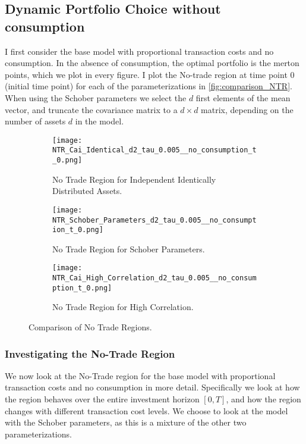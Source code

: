 \documentclass[11pt]{article}
\begin{document}
\subsection{Dynamic Portfolio Choice without consumption} \label{Subsection: NumericalIntegration}
I first consider the base model with proportional transaction costs
and no consumption. In the absence of consumption, the optimal portfolio is the merton points, which we plot in every figure.
I plot the No-trade region at time point 0 (initial time point) for each of the parameterizations in \autoref{fig:comparison_NTR}.
When using the Schober parameters we select the $d$ first elements of the mean vector, and truncate the covariance matrix to a $d \times d$ matrix,
depending on the number of assets $d$ in the model.
\begin{figure}[!ht]
    \centering
    \begin{subfigure}[t]{\textwidth}
        \centering
        \texttt{[image: NTR\_Cai\_Identical\_d2\_tau\_0.005\_\_no\_consumption\_t\_0.png]}
        \caption{No Trade Region for Independent Identically Distributed Assets.}
        \label{fig:NTR_2d_iid}
    \end{subfigure}

    \vspace{1em}

    \begin{subfigure}[t]{0.48\textwidth}
        \centering
        \texttt{[image: NTR\_Schober\_Parameters\_d2\_tau\_0.005\_\_no\_consumption\_t\_0.png]}
        \caption{No Trade Region for Schober Parameters.}
        \label{fig:NTR_2d_Schober}
    \end{subfigure}%
    \hfill
    \begin{subfigure}[t]{0.48\textwidth}
        \centering
        \texttt{[image: NTR\_Cai\_High\_Correlation\_d2\_tau\_0.005\_\_no\_consumption\_t\_0.png]}
        \caption{No Trade Region for High Correlation.}
        \label{fig:NTR_2d_High_Correlation}
    \end{subfigure}

    \caption{Comparison of No Trade Regions.}
    \label{fig:comparison_NTR}
\end{figure}

\subsubsection{Investigating the No-Trade Region} \label{Subsubsection: InvestigatingNTR}
We now look at the No-Trade region for the base model with proportional transaction costs and no consumption in more detail.
Specifically we look at how the region behaves over the entire investment horizon $[0, T]$, and how the region changes with different transaction cost levels.
We choose to look at the model with the Schober parameters, as this is a mixture of the other two parameterizations.
\end{document}
